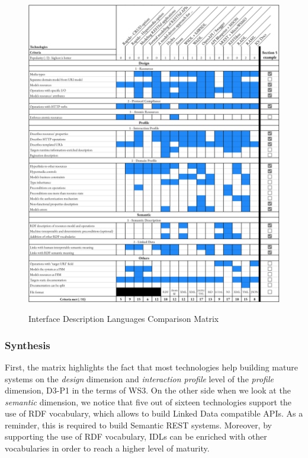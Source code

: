 \begin{figure}[!ht]
\caption{Interface Description Languages Comparison Matrix}
\includegraphics[width=1\textwidth]{figures/IDL.png}
\label{idl-matrix}
\end{figure}

\subsubsection*{Synthesis}


First, the matrix highlights the fact that most technologies help building mature systems on the \textit{design} dimension and \textit{interaction profile} level of the \textit{profile} dimension, D3-P1 in the terms of WS3.
On the other side when we look at the \textit{semantic} dimension, we notice that five out of sixteen technologies support the use of RDF vocabulary, which allows to build Linked Data compatible APIs. As a reminder, this is required to build Semantic REST systems.
Moreover, by supporting the use of RDF vocabulary, IDLs can be enriched with other vocabularies in order to reach a higher level of maturity.


